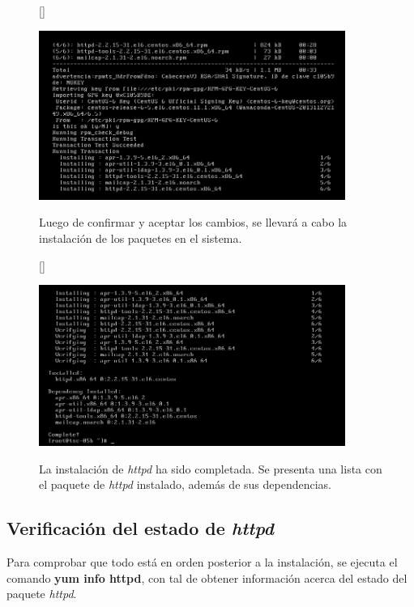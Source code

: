\documentclass[11pt]{article}
\begin{document}
\begin{figure}[ht]
[\FBwidth]
{\caption{Luego de confirmar y aceptar los cambios, se llevará a cabo la instalación de los paquetes en el sistema.}\label{fig:instalando}}
{\includegraphics[width=10cm]{screenshots/httpd-install/instalando.png}}
\end{figure}

\begin{figure}[ht]
[\FBwidth]
{\caption{La instalación de \textit{httpd} ha sido completada. Se presenta una lista con el paquete de \textit{httpd} instalado, además de sus dependencias.}\label{fig:terminado}}
{\includegraphics[width=10cm]{screenshots/httpd-install/terminado.png}}
\end{figure}

\clearpage

\subsection{Verificación del estado de \textit{httpd}}
Para comprobar que todo está en orden posterior a la instalación, se ejecuta el comando \textbf{yum info httpd}, con tal de obtener información acerca del estado del paquete \textit{httpd}.
\end{document}
